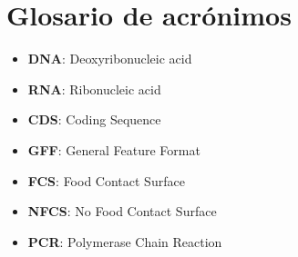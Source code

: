 \chapter*{Glosario de acrónimos}

\begin{itemize}
\item{\textbf{DNA}:  Deoxyribonucleic acid}
\item{\textbf{RNA}:  Ribonucleic acid}
\item{\textbf{CDS}:  Coding Sequence}
\item{\textbf{GFF}: General Feature Format}
\item{\textbf{FCS}: Food Contact Surface}
\item{\textbf{NFCS}: No Food Contact Surface}
\item{\textbf{PCR}: Polymerase Chain Reaction}

\end{itemize}

\newpage \thispagestyle{empty} %

